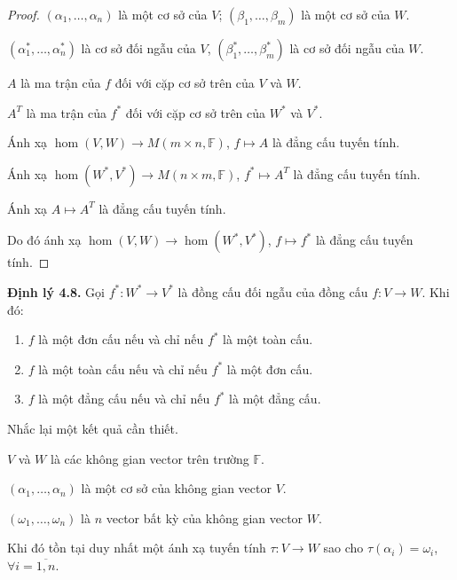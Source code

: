 \documentclass[class=nhvh-linear-algebra,crop=false]{standalone}
\begin{document}
\begin{proof}
    \par $(\alpha_{1}, \ldots, \alpha_{n})$ là một cơ sở của $V$; $(\beta_{1}, \ldots, \beta_{m})$ là một cơ sở của $W$.
    \par $(\alpha^{*}_{1}, \ldots, \alpha^{*}_{n})$ là cơ sở đối ngẫu của $V$, $(\beta^{*}_{1}, \ldots, \beta^{*}_{m})$ là cơ sở đối ngẫu của $W$.
    \par $A$ là ma trận của $f$ đối với cặp cơ sở trên của $V$ và $W$.
    \par $A^{T}$ là ma trận của $f^{*}$ đối với cặp cơ sở trên của $W^{*}$ và $V^{*}$.
    \par Ánh xạ $\hom(V,W)\to M(m\times n,\mathbb{F})$, $f\mapsto A$ là đẳng cấu tuyến tính.
    \par Ánh xạ $\hom(W^{*},V^{*})\to M(n\times m,\mathbb{F})$, $f^{*}\mapsto A^{T}$ là đẳng cấu tuyến tính.
    \par Ánh xạ $A\mapsto A^{T}$ là đẳng cấu tuyến tính.
    \par Do đó ánh xạ $\hom(V,W)\to\hom(W^{*},V^{*})$, $f\mapsto f^{*}$ là đẳng cấu tuyến tính.
\end{proof}

\noindent\textbf{Định lý 4.8.} Gọi $f^{*}: W^{*}\to V^{*}$ là đồng cấu đối ngẫu của đồng cấu $f: V\to W$. Khi đó:
\begin{enumerate}[label = (\arabic*)]
    \item $f$ là một đơn cấu nếu và chỉ nếu $f^{*}$ là một toàn cấu.
    \item $f$ là một toàn cấu nếu và chỉ nếu $f^{*}$ là một đơn cấu.
    \item $f$ là một đẳng cấu nếu và chỉ nếu $f^{*}$ là một đẳng cấu.
\end{enumerate}

\par Nhắc lại một kết quả cần thiết.
\begin{lemma}
    \par $V$ và $W$ là các không gian vector trên trường $\mathbb{F}$.
    \par $(\alpha_{1}, \ldots, \alpha_{n})$ là một cơ sở của không gian vector $V$.
    \par $(\omega_{1}, \ldots, \omega_{n})$ là $n$ vector bất kỳ của không gian vector $W$.
    \par Khi đó tồn tại duy nhất một ánh xạ tuyến tính $\tau: V\to W$ sao cho $\tau(\alpha_{i}) = \omega_{i}$, $\forall i = \overline{1,n}$.
\end{lemma}
\end{document}
